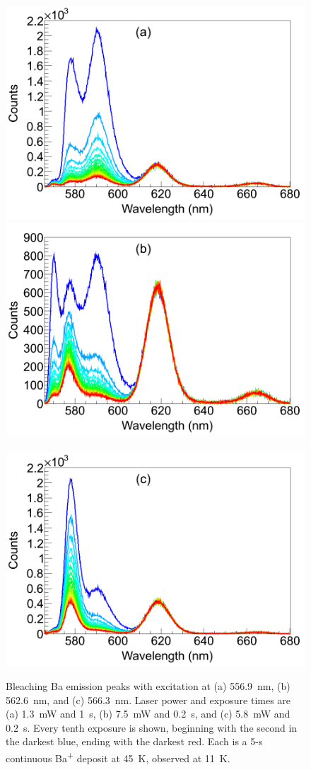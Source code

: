 \begin{figure} %
        \centering
                \includegraphics[width=.5\textwidth]{figures/bleach_spectra_a.png}
                \includegraphics[width=.5\textwidth]{figures/bleach_spectra_b.png}
                ~
                \includegraphics[width=.5\textwidth]{figures/bleach_spectra_c.png}
                \caption{Bleaching Ba emission peaks with excitation at (a) 556.9~nm, (b) 562.6~nm, and (c) 566.3~nm.  Laser power and exposure times are (a) 1.3~mW and 1~s, (b) 7.5~mW and 0.2~s, and (c) 5.8~mW and 0.2~s.  Every tenth exposure is shown, beginning with the second in the darkest blue, ending with the darkest red.  Each is a 5-s continuous Ba\textsuperscript{+} deposit at 45~K, observed at 11~K. \cite{Mong2015}}
\label{fig:specBleach}
\end{figure}


